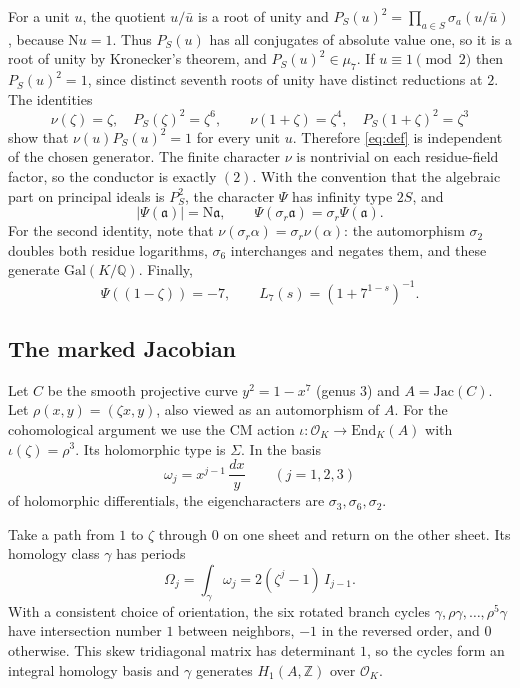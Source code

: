 \documentclass[11pt]{amsart}
\theoremstyle{remark}
\theoremstyle{definition}
\newcommand{\Q}{\mathbb{Q}}
\newcommand{\Z}{\mathbb{Z}}
\newcommand{\OK}{\mathcal{O}_K}
\newcommand{\Nm}{\mathrm{N}}
\begin{document}
For a unit $u$, the quotient $u/\bar u$ is a root of unity and $P_S(u)^2=\prod_{a\in S}\sigma_a(u/\bar u)$, because $\Nm u=1$. Thus $P_S(u)$ has all conjugates of absolute value one, so it is a root of unity by Kronecker's theorem, and $P_S(u)^2\in\mu_7$. If $u\equiv1\pmod 2$ then $P_S(u)^2=1$, since distinct seventh roots of unity have distinct reductions at $2$. The identities
\[
\nu(\zeta)=\zeta,\quad P_S(\zeta)^2=\zeta^6,\qquad \nu(1+\zeta)=\zeta^4,\quad P_S(1+\zeta)^2=\zeta^3
\]
show that $\nu(u)P_S(u)^2=1$ for every unit $u$. Therefore \eqref{eq:def} is independent of the chosen generator. The finite character $\nu$ is nontrivial on each residue-field factor, so the conductor is exactly $(2)$. With the convention that the algebraic part on principal ideals is $P_S^2$, the character $\Psi$ has infinity type $2S$, and
\begin{equation}\label{eq:abs}
|\Psi(\mathfrak a)|=\Nm\mathfrak a,\qquad \Psi(\sigma_r\mathfrak a)=\sigma_r\Psi(\mathfrak a).
\end{equation}
For the second identity, note that $\nu(\sigma_r\alpha)=\sigma_r\nu(\alpha)$: the automorphism $\sigma_2$ doubles both residue logarithms, $\sigma_6$ interchanges and negates them, and these generate $\mathrm{Gal}(K/\Q)$. Finally,
\begin{equation}\label{eq:euler7}
\Psi((1-\zeta))=-7,\qquad L_7(s)=(1+7^{1-s})^{-1}.
\end{equation}

\subsection{The marked Jacobian}
Let $C$ be the smooth projective curve $y^2=1-x^7$ (genus $3$) and $A=\mathrm{Jac}(C)$. Let $\rho(x,y)=(\zeta x,y)$, also viewed as an automorphism of $A$. For the cohomological argument we use the CM action $\iota\colon\OK\to\mathrm{End}_K(A)$ with $\iota(\zeta)=\rho^3$. Its holomorphic type is $\Sigma$. In the basis
\[
\omega_j=x^{j-1}\,\frac{dx}{y}\qquad (j=1,2,3)
\]
of holomorphic differentials, the eigencharacters are $\sigma_3,\sigma_6,\sigma_2$.

Take a path from $1$ to $\zeta$ through $0$ on one sheet and return on the other sheet. Its homology class $\gamma$ has periods
\begin{equation}\label{eq:periods}
\Omega_j=\int_\gamma\omega_j=2(\zeta^{j}-1)\,I_{j-1}.
\end{equation}
With a consistent choice of orientation, the six rotated branch cycles $\gamma,\rho\gamma,\dots,\rho^5\gamma$ have intersection number $1$ between neighbors, $-1$ in the reversed order, and $0$ otherwise. This skew tridiagonal matrix has determinant $1$, so the cycles form an integral homology basis and $\gamma$ generates $H_1(A,\Z)$ over $\OK$.
\end{document}
